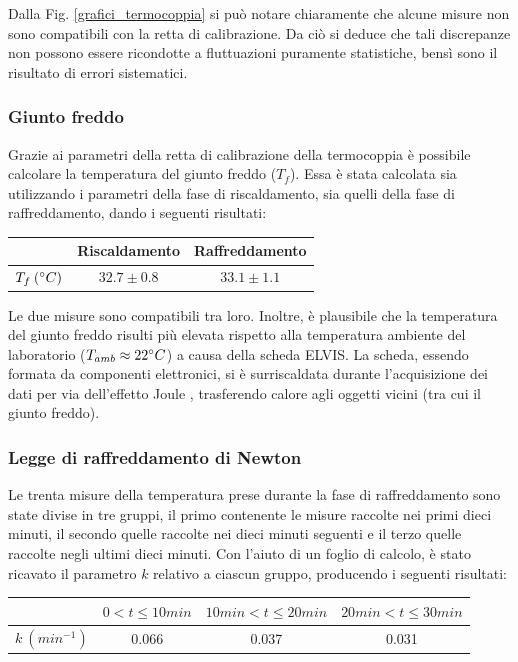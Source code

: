 \documentclass{article}
\begin{document}
\noindent Dalla Fig. \ref{grafici_termocoppia} si può notare chiaramente che alcune misure non sono compatibili con la retta di calibrazione. Da ciò si deduce che tali discrepanze non possono essere ricondotte a fluttuazioni puramente statistiche, bensì sono il risultato di errori sistematici.

\subsubsection{Giunto freddo}
Grazie ai parametri della retta di calibrazione della termocoppia è possibile calcolare la temperatura del giunto freddo ($T_f$). Essa è stata calcolata sia utilizzando i parametri della fase di riscaldamento, sia quelli della fase di raffreddamento, dando i seguenti risultati:

\begin{center}
\begin{tabular}{|c|c|c|}
\hline
 & Riscaldamento & Raffreddamento \\
\hline
$ T_f \medspace (\degree C) $ & $ 32.7 \pm 0.8 $ & $ 33.1 \pm 1.1 $ \\
\hline
\end{tabular}
\end{center}

\noindent Le due misure sono compatibili tra loro. Inoltre, è plausibile che la temperatura del giunto freddo risulti più elevata rispetto alla temperatura ambiente del laboratorio ($ T_{amb} \approx 22 \degree C $) a causa della scheda ELVIS. La scheda, essendo formata da componenti elettronici, si è surriscaldata durante l'acquisizione dei dati per via dell'effetto Joule \cite{joule}, trasferendo calore agli oggetti vicini (tra cui il giunto freddo).

\subsubsection{Legge di raffreddamento di Newton}
Le trenta misure della temperatura prese durante la fase di raffreddamento sono state divise in tre gruppi, il primo contenente le misure raccolte nei primi dieci minuti, il secondo quelle raccolte nei dieci minuti seguenti e il terzo quelle raccolte negli ultimi dieci minuti. Con l'aiuto di un foglio di calcolo, è stato ricavato il parametro $k$ relativo a ciascun gruppo, producendo i seguenti risultati:

\begin{center}
\begin{tabular}{|c|c|c|c|}
\hline
 & $ 0 < t \leqslant 10min $ & $ 10min < t \leqslant 20min $ & $ 20min < t \leqslant 30min $ \\
\hline
$ k \medspace (min^{-1}) $ & 0.066 & 0.037 & 0.031 \\
\hline
\end{tabular}
\end{center}
\end{document}
